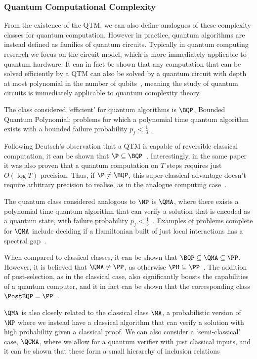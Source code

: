 \subsubsection*{Quantum Computational Complexity}
From the existence of the QTM, we can also define analogues of these complexity classes for quantum computation. However in practice, quantum algorithms are instead defined as families of quantum circuits. Typically in quantum computing research we focus on the circuit model, which is more immediately applicable to quantum hardware. It can in fact be shown that any computation that can be solved efficiently by a QTM can also be solved by a quantum circuit with depth at most polynomial in the number of qubits~\cite{Yao1993}, meaning the study of quantum circuits is immediately applicable to quantum complexity theory.\par 
The class considered `efficient' for quantum algorithms is $\BQP$, Bounded Quantum Polynomial; problems for which a polynomial time quantum algorithm exists with a bounded failure probability $p_{f}<\frac{1}{3}$~\cite{Nielsen2000}.
\par
Following Deutsch's observation that a QTM is capable of reversible classical computation, it can be shown that $\P\subseteq \BQP$~\cite{Bernstein1997}. Interestingly, in the same paper it was also proven that a quantum computation on $T$ steps requires just $O\left(\log{T}\right)$ precision. Thus, if $\P\neq \BQP$, this super-classical advantage doesn't require arbitrary precision to realise, as in the analogue computing case~\cite{Bernstein1997}.\par
The quantum class considered analogous to $\NP$ is $\QMA$, where there exists a polynomial time quantum algorithm that can verify a solution that is encoded as a quantum state, with failure probability $p_{f}<\frac{1}{3}$~\cite{Watrous2008}. Examples of problems complete for $\QMA$ include deciding if a Hamiltonian built of just local interactions has a spectral gap~\cite{Kempe2004}.\par
When compared to classical classes, it can be shown that $\BQP\subseteq \QMA\subseteq \PP$. However, it is believed that $\QMA\neq \PP$, as otherwise $\PH\subseteq \PP$~\cite{Vyalyi03}. The addition of post-selection, as in the classical case, also significantly boosts the capabilities of a quantum computer, and it in fact can be shown that the corresponding class $\PostBQP=\PP$~\cite{Aaronson2004c}.\par
$\QMA$ is also closely related to the classical class $\MA$, a probabilistic version of $\NP$ where we instead have a classical algorithm that can verify a solution with high probability given a classical proof. We can also consider a `semi-classical' case, $\QCMA$, where we allow for a quantum verifier with just classical inputs, and it can be shown that these form a small hierarchy of inclusion relations~\cite{Aharonov2002}
